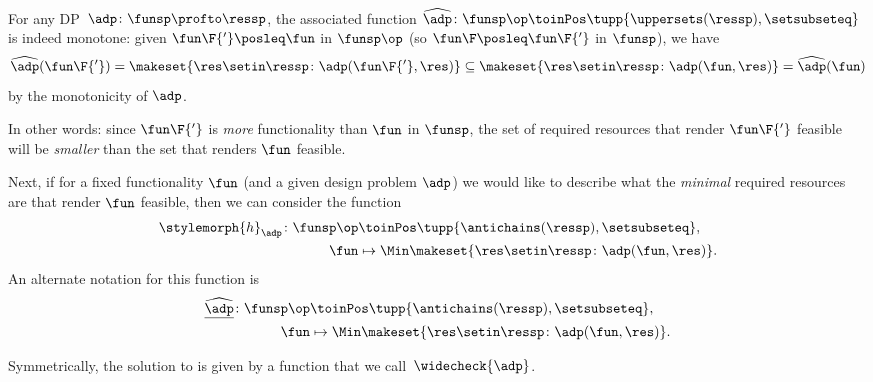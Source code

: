 \begin{remark}[Monotonicity]
    For any DP~$\adp\colon\funsp\profto\ressp$, the associated function $\widehat{\adp} \colon \funsp\op\toinPos \tupp{\uppersets (\ressp), \setsubseteq}$ is indeed monotone: given $\fun\F{'}\posleq \fun$ in $\funsp\op$ (so $\fun\F \posleq  \fun\F{'}$ in $\funsp$), we have
    \begin{equation}
            \widehat{\adp}(\fun\F{'}) = \makeset{ \res \setin \ressp \colon \adp(\fun\F{'}, \res)} \subseteq \makeset{ \res \setin \ressp \colon \adp(\fun, \res)}  =\widehat{\adp}(\fun)
    \end{equation}
        by the monotonicity of $\adp$. 
        
        In other words: since $\fun\F{'}$ is \emph{more} functionality than $\fun$ in $\funsp$, the set of required resources that render $\fun\F{'}$ feasible will be \emph{smaller} than the set that renders $\fun$ feasible. 
\end{remark}

Next, if for a fixed functionality $\fun$ (and a given design problem $\adp$) we would like to describe what the \emph{minimal} required resources are that render $\fun$ feasible, then we can consider the function
    \begin{equation}
        \begin{aligned}
            \stylemorph{h}_\adp \colon \funsp\op & \toinPos \tupp{\antichains (\ressp), \setsubseteq}, \\
            \fun                      & \mapsto \Min \makeset{ \res \setin \ressp \colon \adp(\fun, \res)}.
        \end{aligned}
    \end{equation}
An alternate notation for this function is
    \begin{equation}
        \begin{aligned}
            \underline{\widehat{\adp}} \colon \funsp\op & \toinPos \tupp{\antichains (\ressp), \setsubseteq}, \\
            \fun                      & \mapsto \Min \makeset{ \res \setin \ressp \colon \adp(\fun, \res)}.
        \end{aligned}
    \end{equation}

Symmetrically, the solution to \FixResMaxFun is given by a function that we call~$\widecheck{\adp}$.

